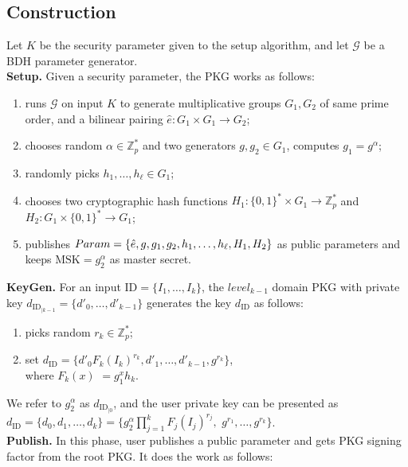 \documentclass[times]{secauth}
\theoremstyle{definition}
\theoremstyle{remark}
\begin{document}
\subsection{Construction}
Let $K$ be the security parameter given to the setup algorithm, and let $\mathcal{G}$ be a BDH parameter generator.
\\
\textbf{Setup.} Given a security parameter, the PKG works as follows:
\begin{enumerate}
\item runs $\mathcal{G}$ on input $K$ to generate multiplicative groups $G_1, G_2$ of same prime order, and a bilinear pairing $\hat{e}: G_1 \times G_1 \rightarrow G_2$;
\item chooses random $\alpha \in \mathbb{Z}^*_p$ and two generators $g, g_2 \in G_1$, computes $g_1 = g^\alpha$;
\item randomly picks $h_1, \ldots, h_\ell \in G_1$;
\item chooses two cryptographic hash functions $H_1: \{0, 1\}^* \times G_1 \rightarrow \mathbb{Z}_p^*$ and $H_2: G_1 \times \{0, 1\}^* \rightarrow G_1$;
\item publishes $Param = \{\hat{e}, g, g_1,  g_2, h_1, \ldots, h_\ell, H_1, \\H_2\}$ as public parameters and keeps $\mathrm{MSK} = g_2^\alpha$ as master secret.
\end{enumerate}
\textbf{KeyGen.} For an input $\mathrm{ID} = \{I_1, \ldots, I_k\}$, the $level_{k-1}$ domain PKG with private key $d_{\mathrm{ID}_{\mid k-1}} = \{d'_0, \ldots, d'_{k-1}\}$ generates the key $d_\mathrm{ID}$ as follows:
\begin{enumerate}
\item picks random $r_k \in \mathbb{Z}_p^*$;
\item set $d_{\mathrm{ID}} = \{d'_0F_k(I_k)^{r_k}, d'_1, \ldots, d'_{k-1}, g^{r_k}\}$,\\ where $F_k(x)$ $ = g_1^xh_k$.
\end{enumerate}
\par
We refer to $g_2^\alpha$ as $d_{\mathrm{ID}_{\mid 0}}$, and the user private key can be presented as 
$d_{\mathrm{ID}} = \{d_0, d_1, \ldots, d_k\} = \{g_2^\alpha \prod^k_{j=1} F_j(I_j)^{r_j},$ $g^{r_1}, \ldots, g^{r_k}\}$.
\vspace{0.2cm}
\\
\textbf{Publish.} In this phase, user publishes a public parameter and gets PKG signing factor from the root PKG. 
It does the work as follows:
\end{document}
